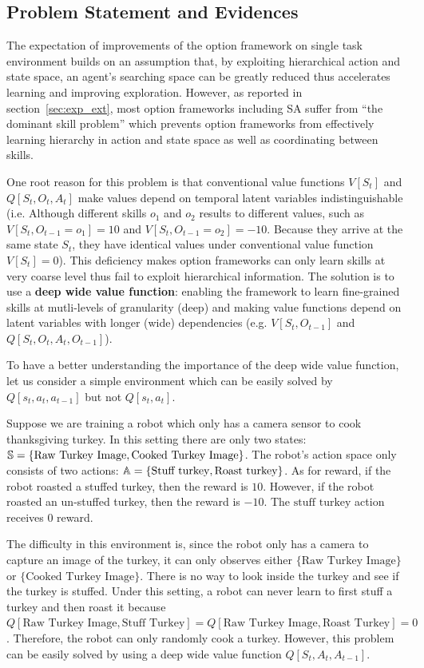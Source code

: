 \subsection{Problem Statement and Evidences}
\label{sec:append_turkey}

The expectation of improvements of the option framework on single
task environment builds on an assumption that, by exploiting
hierarchical action and state space, an agent's searching space
can be greatly reduced thus accelerates learning and improving
exploration. However, as reported in section~\ref{sec:exp_ext},
most option frameworks including SA suffer from ``the dominant
skill problem'' \cite{zhang2019dac} which prevents option
frameworks from effectively learning hierarchy in action and
state space as well as coordinating between skills.

One root reason for this problem is that conventional value
functions $V[S_t]$ and $Q[S_t,O_t,A_t]$ make values depend on
temporal latent variables indistinguishable (i.e. Although
different skills $o_1$ and $o_2$ results to different values,
such as $V[S_t,O_{t-1}=o_1]=10$ and $V[S_t,O_{t-1}=o_2]=-10$.
Because they arrive at the same state $S_t$, they have identical
values under conventional value function $V[S_t]=0$). This
deficiency makes option frameworks can only learn skills at very
coarse level thus fail to exploit hierarchical information. The
solution is to use a \textbf{deep wide value function}: enabling
the framework to learn fine-grained skills at mutli-levels of
granularity (deep) and making value functions depend on latent
variables with longer (wide) dependencies (e.g. $V[S_t,O_{t-1}]$
and $Q[S_t,O_t,A_t,O_{t-1}]$).

To have a better understanding the importance of the deep wide
value function, let us consider a simple environment which can be
easily solved by $Q[s_t,a_t,a_{t-1}]$ but not $Q[s_t,a_t]$.

Suppose we are training a robot which only has a camera sensor to
cook thanksgiving turkey. In this setting there are only two
states: ${\mathbb{S}}=\{\text{Raw Turkey Image},\text{Cooked Turkey
  Image}\}$. The robot's action space only consists of two
actions: ${\mathbb{A}}=\{\text{Stuff turkey},\text{Roast turkey}\}$. As
for reward, if the robot roasted a stuffed turkey, then the
reward is $10$. However, if the robot roasted an un-stuffed
turkey, then the reward is $-10$. The $\text{stuff turkey}$
action receives $0$ reward.

The difficulty in this environment is, since the robot only has a
camera to capture an image of the turkey, it can only observes
either $\{\text{Raw Turkey Image}\}$ or $\{\text{Cooked Turkey
  Image}\}$. There is no way to look inside the turkey and see if
the turkey is stuffed. Under this setting, a robot can never
learn to first stuff a turkey and then roast it because
$Q[\text{Raw Turkey Image},\text{Stuff Turkey}] = Q[\text{Raw
  Turkey Image},\text{Roast Turkey}] = 0$. Therefore, the robot
can only randomly cook a turkey. However, this problem can be
easily solved by using a deep wide value function
$Q[S_t,A_t,A_{t-1}]$.

